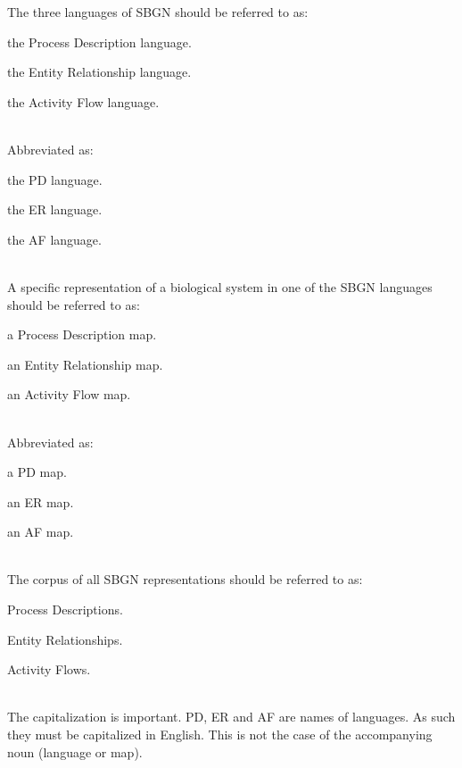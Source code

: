 The three languages of SBGN should be referred to as:

\begin{compactitem}
\item the Process Description language.
\item the Entity Relationship language.
\item the Activity Flow language.
\end{compactitem}

\mbox{}\\
Abbreviated as:

\begin{compactitem}
\item the PD language.
\item the ER language.
\item the AF language.
\end{compactitem}

\mbox{}\\
A specific representation of a biological system in one of the SBGN languages should be referred to as:

\begin{compactitem}
\item a Process Description map.
\item an Entity Relationship map.
\item an Activity Flow map.
\end{compactitem}

\mbox{}\\
Abbreviated as:

\begin{compactitem}
\item a PD map.
\item an ER map.
\item an AF map.
\end{compactitem}

\mbox{}\\
The corpus of all SBGN representations should be referred to as:

\begin{compactitem}
\item Process Descriptions.
\item Entity Relationships.
\item Activity Flows.
\end{compactitem}

\mbox{}\\
 The capitalization is important. PD, ER and AF are names of languages. As such they must be capitalized in English. This is not the case of the accompanying noun (language or map).

